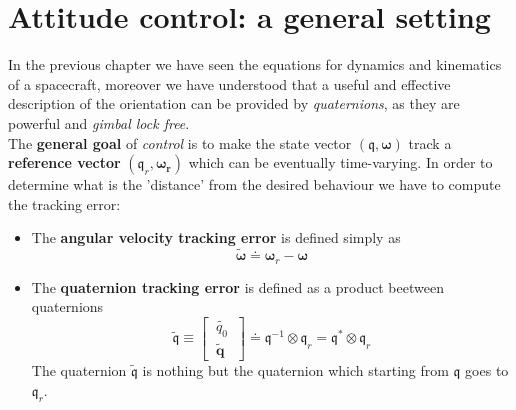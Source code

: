 \section{Attitude control: a general setting}
In the previous chapter we have seen the equations for dynamics and kinematics of a spacecraft, moreover we have understood that a useful and effective description of the orientation can be provided by  \textit{quaternions}, as they are powerful and \textit{gimbal lock free}.\\
The \textbf{general goal} of \textit{control} is to make the state vector $(\mathfrak{q}, \boldsymbol{\omega})$ track a \textbf{reference vector} $(\mathfrak{q}_r, \boldsymbol{\omega_r})$ which can be eventually time-varying. In order to determine what is the 'distance' from the desired behaviour we have to compute the tracking error:
\begin{itemize}
    \item The \textbf{angular velocity tracking error} is defined simply as
    \begin{equation*}
        \tilde{\boldsymbol{\omega}} \doteq \boldsymbol{\omega}_r - \boldsymbol{\omega}
    \end{equation*}
    \item The \textbf{quaternion tracking error} is defined as a product beetween quaternions
    \begin{equation*}
        \tilde{\mathfrak{q}} \equiv \begin{bmatrix}
          \   \tilde{q_0} \ \\\ \tilde{\mathbf{q}} \
        \end{bmatrix} \doteq \mathfrak{q}^{-1} \otimes \mathfrak{q}_r = \mathfrak{q}^* \otimes \mathfrak{q}_r
    \end{equation*}
    The quaternion $\tilde{\mathfrak{q}}$ is nothing but the quaternion which starting from $\mathfrak{q}$ goes to $\mathfrak{q}_r$. 
\end{itemize}

